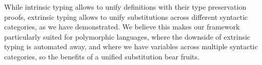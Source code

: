 \documentclass[a4paper, UKenglish, cleveref, autoref, thm-restate]{lipics-v2021}
\newenvironment{LibCode*}{%
  \begin{tcolorbox}[%
    colframe=white,%
    boxrule=0.0pt,%
    top=2.5pt,%
    left=2.5pt,%
    bottom=2.5pt,%
    right=2.5pt,%
    before skip=5pt,%
    after skip=5pt,%
    boxsep=0pt%
  ]
}{%
  \end{tcolorbox}%
}
\newcommand*\LibCode[1]{\begin{LibCode*}{#1}\end{LibCode*}}
\newcommand*\AppCode[1]{{#1}}
\begin{document}
  While intrinsic typing allows to unify definitions with their type
  preservation proofs, extrinsic typing allows to unify
  substitutions across different syntactic categories, as we have demonstrated.
  We believe this makes our framework particularly suited for polymorphic languages,
  where the downside of extrinsic typing is automated away, and where we have variables
  across multiple syntactic categories, so the benefits of a unified
  substitution bear fruits.





  

  \clearpage




\end{document}
